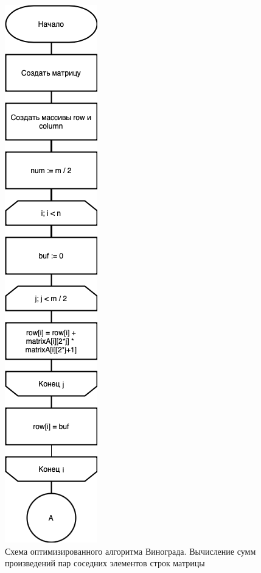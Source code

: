 \begin{figure}[h]
    \centering
    \includegraphics[width=0.25\linewidth]{img/WinogradOptA.png}
    \caption{Схема оптимизированного алгоритма Винограда. Вычисление сумм произведений 
    пар соседних элементов строк матрицы}
    \label{fig:mpr2}
\end{figure}


